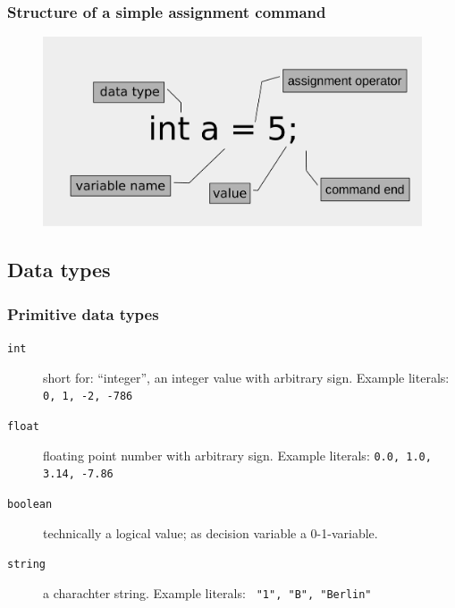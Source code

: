 \begin{frame}
 \frametitle{Structure of a simple assignment command}
 \begin{figure}
  \centering
  \includegraphics[width=\linewidth]{Bilder/OPL-Anweisung}
 \end{figure}
\end{frame}

\subsection{Data types}
\begin{frame}
 \frametitle{Primitive data types}
 \begin{description}
  \item[\texttt{int}] short for: ``integer'', an integer value with arbitrary sign. 
  Example literals: \texttt{0, 1, -2, -786}
  \item[\texttt{float}] floating point number with arbitrary sign.
  Example literals: \texttt{0.0, 1.0, 3.14, -7.86}
  \item[\texttt{boolean}] technically a logical value; as decision variable a 0-1-variable.
  \item[\texttt{string}] a charachter string. Example literals:
  \texttt{ "1", "B", "Berlin"}
 \end{description}
\end{frame}



